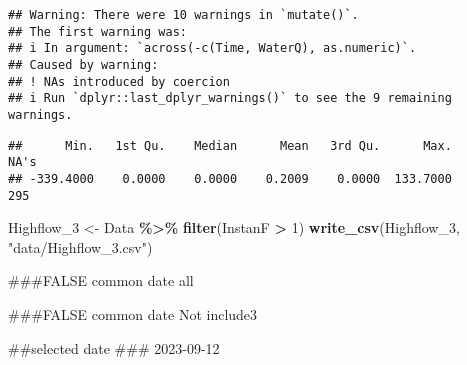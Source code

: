 \documentclass[
]{article}
\newenvironment{Shaded}{\begin{snugshade}}{\end{snugshade}}
\newcommand{\DecValTok}[1]{\textcolor[rgb]{0.00,0.00,0.81}{#1}}
\newcommand{\FunctionTok}[1]{\textcolor[rgb]{0.13,0.29,0.53}{\textbf{#1}}}
\newcommand{\NormalTok}[1]{#1}
\newcommand{\OtherTok}[1]{\textcolor[rgb]{0.56,0.35,0.01}{#1}}
\newcommand{\SpecialCharTok}[1]{\textcolor[rgb]{0.81,0.36,0.00}{\textbf{#1}}}
\newcommand{\StringTok}[1]{\textcolor[rgb]{0.31,0.60,0.02}{#1}}
\begin{document}
\begin{verbatim}
## Warning: There were 10 warnings in `mutate()`.
## The first warning was:
## i In argument: `across(-c(Time, WaterQ), as.numeric)`.
## Caused by warning:
## ! NAs introduced by coercion
## i Run `dplyr::last_dplyr_warnings()` to see the 9 remaining warnings.
\end{verbatim}

\begin{Shaded}
\end{Shaded}

\begin{verbatim}
##      Min.   1st Qu.    Median      Mean   3rd Qu.      Max.      NA's 
## -339.4000    0.0000    0.0000    0.2009    0.0000  133.7000       295
\end{verbatim}

\begin{Shaded}
\begin{Highlighting}[]
\NormalTok{Highflow\_3 }\OtherTok{\textless{}{-}}\NormalTok{ Data }\SpecialCharTok{\%\textgreater{}\%} \FunctionTok{filter}\NormalTok{(InstanF }\SpecialCharTok{\textgreater{}} \DecValTok{1}\NormalTok{)}
\FunctionTok{write\_csv}\NormalTok{(Highflow\_3, }\StringTok{"data/Highflow\_3.csv"}\NormalTok{)}
\end{Highlighting}
\end{Shaded}

\#\#\#FALSE common date all

\#\#\#FALSE common date Not include3

\#\#selected date \#\#\# 2023-09-12
\end{document}
